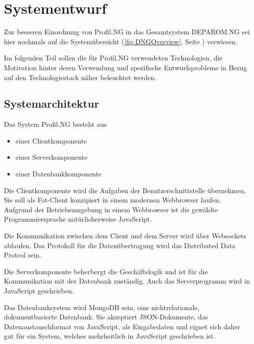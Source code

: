 
\chapter{Systementwurf} %

\label{ch:Systementwurf} %


Zur besseren Einordnung von Profil.NG in das Gesamtsystem DEPAROM.NG sei hier
nochmals auf die  Systemübersicht (\autoref{fig:DNGOverview}, Seite
\pageref{fig:DNGOverview}) verwiesen.

Im folgenden Teil sollen die für Profil.NG verwendeten Technologien, die
Motivation hinter deren Verwendung und spezifische Entwurfsprobleme in Bezug auf
den Technologiestack näher beleuchtet werden.

\section{Systemarchitektur}

Das System Profil.NG besteht aus

\begin{itemize}
  \item{einer Clientkomponente}
  \item{einer Serverkomponente}
  \item{einer Datenbankkomponente}
\end{itemize}

Die Clientkomponente wird die Aufgaben der Benutzerschnittstelle übernehmen. Sie
soll als Fat-Client konzipiert in einem modernen Webbrowser laufen. Aufgrund der
Betriebsumgebung in einem Webbrowser ist die gewählte Programmiersprache
natürlicherweise JavaScript.

Die Kommunikation zwischen dem Client und dem Server wird über Websockets
ablaufen. Das Protokoll für die Datenübertragung wird das Distributed Data
Protcol \cite{ddp} sein.

Die Serverkomponente beherbergt die Geschäftslogik und ist für die Kommunikation
mit der Datenbank zuständig. Auch das Serverprogramm wird in JavaScript
geschrieben.

Das Datenbanksystem wird MongoDB sein, eine nichtrelationale, dokumentbasierte
Datenbank. Sie akzeptiert JSON-Dokumente, das Datenaustauschformat von
JavaScript, als Eingabedaten und eignet sich daher gut für ein System, welches
mehrheitlich in JavaScript geschrieben ist.

